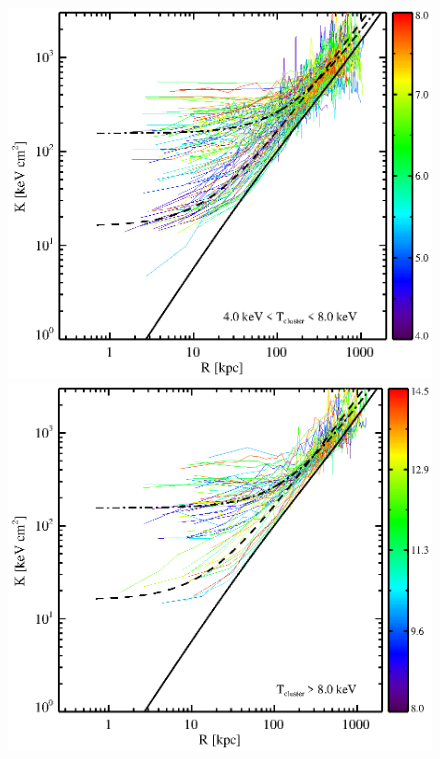 \begin{center}
\begin{figure}[htp]
\begin{minipage}[htp]{0.5\linewidth}
    \end{minipage}
    \begin{minipage}[htp]{0.5\linewidth}
      \includegraphics*[width=\textwidth, trim=28mm 7mm 30mm 17mm, clip]{splots_gt4tle8.eps}
    \end{minipage}
    \begin{minipage}[htp]{0.5\linewidth}
      \includegraphics*[width=\textwidth, trim=28mm 7mm 30mm 17mm, clip]{splots_tgt8.eps}

\end{minipage}
\end{figure}
\end{center}
